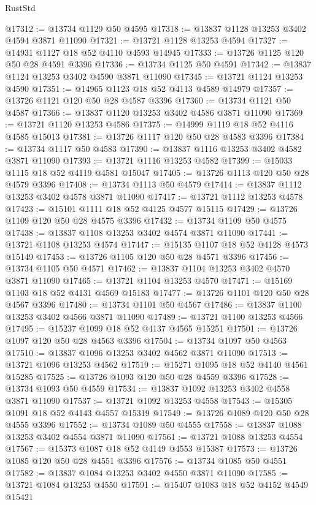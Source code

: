 \begin{lexlean}{RustStd}
\begin{coremodule}
@17312 := @13734 @1129 @50 @4595
@17318 := @13837 @1128 @13253 @3402 @4594 @3871 @11090
@17321 := @13721 @1128 @13253 @4594
@17327 := @14931 @1127 @18 @52 @4110 @4593 @14945
@17333 := @13726 @1125 @120 @50 @28 @4591 @3396
@17336 := @13734 @1125 @50 @4591
@17342 := @13837 @1124 @13253 @3402 @4590 @3871 @11090
@17345 := @13721 @1124 @13253 @4590
@17351 := @14965 @1123 @18 @52 @4113 @4589 @14979
@17357 := @13726 @1121 @120 @50 @28 @4587 @3396
@17360 := @13734 @1121 @50 @4587
@17366 := @13837 @1120 @13253 @3402 @4586 @3871 @11090
@17369 := @13721 @1120 @13253 @4586
@17375 := @14999 @1119 @18 @52 @4116 @4585 @15013
@17381 := @13726 @1117 @120 @50 @28 @4583 @3396
@17384 := @13734 @1117 @50 @4583
@17390 := @13837 @1116 @13253 @3402 @4582 @3871 @11090
@17393 := @13721 @1116 @13253 @4582
@17399 := @15033 @1115 @18 @52 @4119 @4581 @15047
@17405 := @13726 @1113 @120 @50 @28 @4579 @3396
@17408 := @13734 @1113 @50 @4579
@17414 := @13837 @1112 @13253 @3402 @4578 @3871 @11090
@17417 := @13721 @1112 @13253 @4578
@17423 := @15101 @1111 @18 @52 @4125 @4577 @15115
@17429 := @13726 @1109 @120 @50 @28 @4575 @3396
@17432 := @13734 @1109 @50 @4575
@17438 := @13837 @1108 @13253 @3402 @4574 @3871 @11090
@17441 := @13721 @1108 @13253 @4574
@17447 := @15135 @1107 @18 @52 @4128 @4573 @15149
@17453 := @13726 @1105 @120 @50 @28 @4571 @3396
@17456 := @13734 @1105 @50 @4571
@17462 := @13837 @1104 @13253 @3402 @4570 @3871 @11090
@17465 := @13721 @1104 @13253 @4570
@17471 := @15169 @1103 @18 @52 @4131 @4569 @15183
@17477 := @13726 @1101 @120 @50 @28 @4567 @3396
@17480 := @13734 @1101 @50 @4567
@17486 := @13837 @1100 @13253 @3402 @4566 @3871 @11090
@17489 := @13721 @1100 @13253 @4566
@17495 := @15237 @1099 @18 @52 @4137 @4565 @15251
@17501 := @13726 @1097 @120 @50 @28 @4563 @3396
@17504 := @13734 @1097 @50 @4563
@17510 := @13837 @1096 @13253 @3402 @4562 @3871 @11090
@17513 := @13721 @1096 @13253 @4562
@17519 := @15271 @1095 @18 @52 @4140 @4561 @15285
@17525 := @13726 @1093 @120 @50 @28 @4559 @3396
@17528 := @13734 @1093 @50 @4559
@17534 := @13837 @1092 @13253 @3402 @4558 @3871 @11090
@17537 := @13721 @1092 @13253 @4558
@17543 := @15305 @1091 @18 @52 @4143 @4557 @15319
@17549 := @13726 @1089 @120 @50 @28 @4555 @3396
@17552 := @13734 @1089 @50 @4555
@17558 := @13837 @1088 @13253 @3402 @4554 @3871 @11090
@17561 := @13721 @1088 @13253 @4554
@17567 := @15373 @1087 @18 @52 @4149 @4553 @15387
@17573 := @13726 @1085 @120 @50 @28 @4551 @3396
@17576 := @13734 @1085 @50 @4551
@17582 := @13837 @1084 @13253 @3402 @4550 @3871 @11090
@17585 := @13721 @1084 @13253 @4550
@17591 := @15407 @1083 @18 @52 @4152 @4549 @15421

\end{coremodule}
\end{lexlean}
